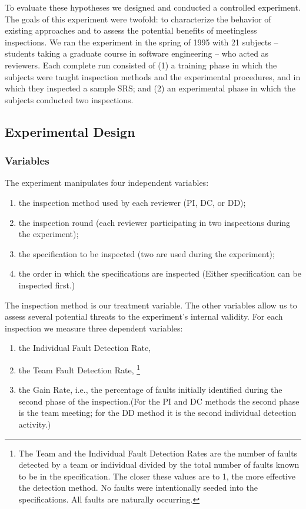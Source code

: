 
To evaluate these hypotheses 
we designed and conducted a controlled 
experiment. The goals of this experiment were twofold: 
to characterize the behavior of existing approaches
and to assess the potential benefits of 
meetingless inspections. We ran the experiment
in the spring of 1995 with 21 subjects 
-- students taking a graduate course in software engineering --
who acted as reviewers. Each complete run consisted of (1)
a training phase in which the subjects were taught
inspection methods and the experimental procedures, and 
in which they inspected a sample SRS; and (2) 
an experimental phase in which the subjects conducted 
two inspections.

\subsection{Experimental Design}
\label{design}

\subsubsection{Variables}
\label{variables}
The experiment manipulates four independent variables:

\begin{enumerate}
\item the inspection method used by each reviewer (PI, DC, or DD);
\item the inspection round (each reviewer participating in two inspections 
during the experiment);
\item the specification to be inspected (two are used during the 
experiment);
\item the order in which the specifications are inspected (Either 
specification can be inspected first.)
\end{enumerate}


The inspection method is our treatment variable. The other 
variables allow us to assess several potential threats to 
the experiment's internal validity. For each inspection 
we measure three dependent variables:

\begin{enumerate}
\item the Individual Fault Detection Rate, 
\item  the Team Fault Detection Rate,
\footnote{The Team and the Individual Fault Detection Rates are the 
number of faults detected by a team or individual divided by the 
total number of faults known to be in the specification.  
The closer these values are to 1, the more effective the detection method. 
No faults were intentionally seeded into the specifications. All 
faults are naturally occurring.}
\item the Gain Rate, i.e., the percentage of faults 
initially identified during the 
second phase of the inspection.(For the PI and DC methods
the second phase is the team meeting; for the DD method it is the
second individual detection activity.)
\end{enumerate}


